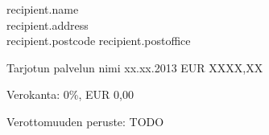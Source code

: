 \documentclass[a4paper]{scrlttr2}
\begin{document}
 
\begin{letter}{{{recipient.name}} \\ {{recipient.address}} \\ {{recipient.postcode}} {{recipient.postoffice}}}

\opening{}
 

\noindent Tarjotun palvelun nimi xx.xx.2013 \hfill EUR XXXX,XX
    

\noindent Verokanta: \hfill 0\%, EUR 0,00

\noindent Verottomuuden peruste: TODO
 

\closing{}
 
\end{letter}
 
\end{document}
